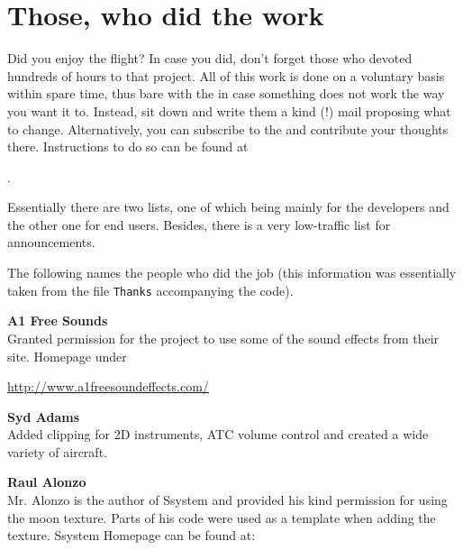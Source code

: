 
\section{Those, who did the work}

Did you enjoy the flight? In case you did, don't forget those who devoted hundreds of
hours to that project. All of this work is done on a voluntary basis within spare time,
thus bare with the  in case something does not work the way you want
it to. Instead, sit down and write them a kind (!) mail proposing what to change.
Alternatively, you can subscribe to the \FlightGear{}  and
contribute your thoughts there. Instructions to do so can be found at
 \medskip

 .
  \medskip

\noindent
 Essentially there are two lists, one of which being mainly for the developers
and the other one for end users. Besides, there is a very low-traffic list for
announcements.
\medskip

 \noindent
The following names the people who did the job (this information was essentially taken
from the file \texttt{Thanks} accompanying the code).
 \medskip

\noindent \textbf{A1 Free Sounds}\\
   Granted permission for the \FlightGear{} project to use some of the sound effects from their
   site. Homepage under
   \medskip

   \href{http://www.a1freesoundeffects.com/}{http://www.a1freesoundeffects.com/}
   \medskip

\noindent \textbf{Syd Adams}\\
  Added clipping for 2D instruments, ATC volume control and created a wide variety of aircraft.
 \medskip

\noindent \textbf{Raul Alonzo}\\
   Mr. Alonzo is the
 author of Ssystem and provided his kind permission for using the moon texture.
 Parts of his code were used as a template when adding the texture.
  Ssystem Homepage can be found at:
   \medskip

